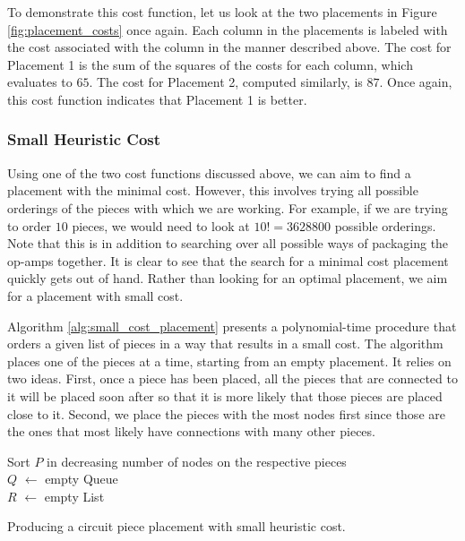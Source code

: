 To demonstrate this cost function, let us look at the two placements in Figure
\ref{fig:placement_costs} once again. Each column in the placements is labeled
with the cost associated with the column in the manner described above. The cost
for Placement 1 is the sum of the squares of the costs for each column, which
evaluates to $65$. The cost for Placement 2, computed similarly, is $87$. Once
again, this cost function indicates that Placement 1 is better.

\subsubsection{Small Heuristic Cost}

Using one of the two cost functions discussed above, we can aim to find a
placement with the minimal cost. However, this involves trying all possible
orderings of the pieces with which we are working. For example, if we are trying
to order $10$ pieces, we would need to look at $10! = 3628800$ possible
orderings. Note that this is in addition to
searching over all possible ways
of packaging the op-amps together. It is clear to see that the search for a
minimal cost placement quickly gets out of hand.
Rather than looking for an optimal placement, we aim for a placement with small
cost.

Algorithm \ref{alg:small_cost_placement} presents a polynomial-time procedure
that orders a
given list of pieces in a way that results in a small cost. The algorithm places
one of the pieces at a time, starting from an empty placement. It relies
on two ideas. First, once a piece has been placed, all the pieces that are
connected to it will be placed soon after so that it is more likely that those
pieces are placed close to it. Second, we place the pieces with the most nodes
first since those are the ones that most likely have connections with many other
pieces.

\begin{algorithm}
\BlankLine
Sort $P$ in decreasing number of nodes on the respective pieces\\
$Q$ $\leftarrow$ empty Queue\\
$R$ $\leftarrow$ empty List\\
\caption{Producing a circuit piece placement with small heuristic cost.}
\label{alg:small_cost_placement}
\end{algorithm}

